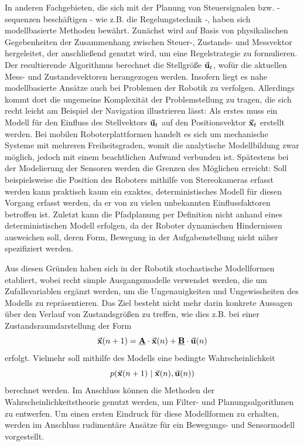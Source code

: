 In anderen Fachgebieten, die sich mit der Planung von Steuersignalen bzw. -sequenzen beschäftigen - wie z.B. die Regelungstechnik -, haben sich modellbasierte Methoden bewährt. Zunächst wird auf Basis von physikalischen Gegebenheiten der Zusammenhang zwischen Steuer-, Zustands- und Messvektor hergeleitet, der anschließend genutzt wird, um eine Regelstrategie zu formulieren. Der resultierende Algorithmus berechnet die Stellgröße $\vec{\mathbf{u}}_t$, wofür die aktuellen Mess- und Zustandsvektoren herangezogen werden. Insofern liegt es nahe modellbasierte Ansätze auch bei Problemen der Robotik zu verfolgen. Allerdings kommt dort die ungemeine Komplexität der Problemstellung zu tragen, die sich recht leicht am Beispiel der Navigation illustrieren lässt: Als erstes muss ein Modell für den Einfluss des Stellvektors $\vec{\mathbf{u}}_t$ auf den Positionsvektor $\vec{\mathbf{x}}_t$ erstellt werden. Bei mobilen Roboterplattformen handelt es sich um mechanische Systeme mit mehreren Freiheitsgraden, womit die analytische Modellbildung zwar möglich, jedoch mit einem beachtlichen Aufwand verbunden ist. Spätestens bei der Modelierung der Sensoren werden die Grenzen des Möglichen erreicht: Soll beispielsweise die Position des Roboters mithilfe von Stereokameras erfasst werden kann praktisch kaum ein exaktes, deterministisches Modell für diesen Vorgang erfasst werden, da er von zu vielen unbekannten Einflussfaktoren betroffen ist. Zuletzt kann die Pfadplanung per Definition nicht anhand eines deterministischen Modell erfolgen, da der Roboter dynamischen Hindernissen ausweichen soll, deren Form, Bewegung in der Aufgabenstellung nicht näher spezifiziert werden.

Aus diesen Gründen haben sich in der Robotik stochastische Modellformen etabliert, wobei recht simple Ausgangsmodelle verwendet werden, die um Zufallsvariablen ergänzt werden, um die Ungenauigkeiten und Ungewissheiten des Modells zu repräsentieren. Das Ziel besteht nicht mehr darin konkrete Aussagen über den Verlauf von Zustandsgrößen zu treffen, wie dies z.B. bei einer Zustandsraumdarstellung der Form
\begin{equation}
\vec{\mathbf{x}}(n+1) = \mathbf{\underline{{{A}}}}\cdot \vec{\mathbf{x}}(n) + \mathbf{\underline{{B}}}\cdot \vec{\mathbf{\mathbf{u}}}(n)
\end{equation}
erfolgt. Vielmehr soll mithilfe des Modells eine bedingte Wahrscheinlichkeit
\begin{equation}
p({\vec{\mathbf{x}}(n+1)} \hspace{1mm} \vert \hspace{1mm} {\vec{\mathbf{x}}(n), \vec{\mathbf{u}}(n)})
\end{equation}
berechnet werden. Im Anschluss können die Methoden der Wahrscheinlichkeitstheorie genutzt werden, um Filter- und Planungsalgorithmen zu entwerfen. Um einen ersten Eindruck für diese Modellformen zu erhalten, werden im Anschluss rudimentäre Ansätze für ein Bewegungs- und Sensormodell vorgestellt.

